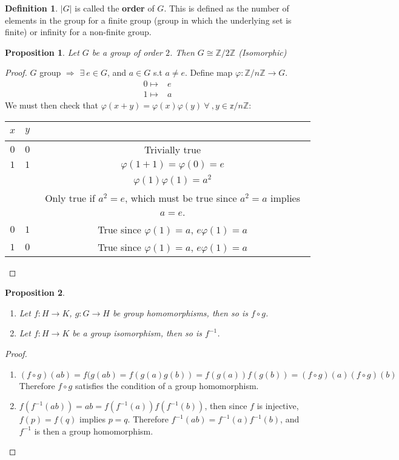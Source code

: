 \documentclass{article}
\newtheorem{theorem}{Proposition}[section]
\theoremstyle{definition}
\newtheorem{definition}{Definition}[section]
\theoremstyle{remark}
\begin{document}
\begin{definition}
$|G|$ is called the \textbf{order} of $G$. This is defined as the number of elements in the group for a finite group (group in which the underlying set is finite) or infinity for a non-finite group.\\
\end{definition}
\begin{theorem}
Let $G$ be a group of order $2$. Then $G\cong \mathbb{Z}/2\mathbb{Z}$ (Isomorphic)
\end{theorem}
\begin{proof}
$G$ group $\Rightarrow$ $\exists~e\in G$, and $ a\in G$ s.t $a\neq e$. Define map $\varphi:\mathbb{Z}/n\mathbb{Z}\rightarrow G$.
\begin{align*}
0\mapsto&e\\
1\mapsto&a
\end{align*}
We must then check that $\varphi(x+y)=\varphi(x)\varphi(y)~\forall~,y\in \mathbb{z}/n\mathbb{Z}$:\\
\begin{center}
\begin{tabular}{c|c|c}
$x$&$y$&~\\
\hline
$0$&$0$&Trivially true\\
\hline
$1$&$1$&$\varphi(1+1)=\varphi(0)=e$\\
~&~&$\varphi (1)\varphi(1)=a^2$\\
~&~&Only true if $a^2=e$, which must be true since $a^2=a$ implies $a=e$.\\
\hline
$0$&$1$&True since $\varphi(1)=a$, $e\varphi(1)=a$\\
\hline
$1$&$0$&True since $\varphi(1)=a$, $e\varphi(1)=a$\\
\end{tabular}
\end{center}
\end{proof}
\begin{theorem}~
\begin{enumerate}
\item Let $f:H\rightarrow K$, $g:G\rightarrow H$ be group homomorphisms, then so is $f\circ g$.
\item Let $f:H\rightarrow K$ be a group isomorphism, then so is $f^{-1}$.
\end{enumerate}
\end{theorem}
\begin{proof}~
\begin{enumerate}
\item $ (f\circ g)(ab)=f(g(ab)=f(g(a)g(b))=f(g(a))f(g(b))=(f\circ g)(a)(f\circ g)(b)$\\
Therefore $f\circ g$ satisfies the condition of a group homomorphism.
\item $f(f^{-1}(ab))=ab=f(f^{-1}(a))f(f^{-1}(b))$, then since $f$ is injective, $f(p)=f(q)$ implies $p=q$. Therefore $f^{-1}(ab)=f^{-1}(a)f^{-1}(b)$, and $f^{-1}$ is then a group homomorphism.
\end{enumerate}
\end{proof}
\newpage
\end{document}
